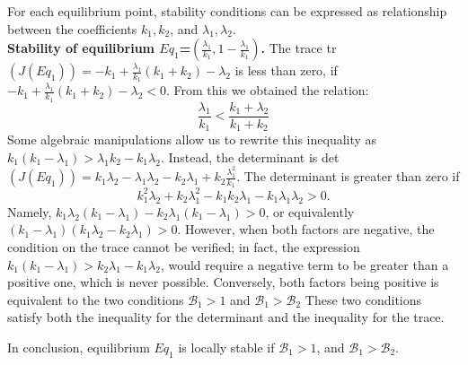 For each equilibrium point, stability conditions can be expressed as relationship between the coefficients $k_1, k_2$, and $\lambda_1, \lambda_2$.\\

\noindent\textbf{Stability of equilibrium $Eq_1$=$(\frac{\lambda_1}{k_1}, 1-\frac{\lambda_1}{k_1})$.} The trace tr$(J(Eq_1)) = - k_1 + \frac{\lambda_1}{k_1}(k_1+k_2) - \lambda_2$ is  less than zero, if $-k_1 + \frac{\lambda_1}{k_1}( k_1 + k_2) - \lambda_2 < 0$. From this we obtained the relation:
\[\frac{\lambda_1}{k_1} < \frac{k_1 + \lambda_2}{k_1 + k_2} \]
Some algebraic manipulations allow us to rewrite this inequality as $k_1 (k_1 - \lambda_1) > \lambda_1 k_2 - k_1 \lambda_2$. Instead, the determinant is det$(J(Eq_1)) = k_1 \lambda_2 - \lambda_1 \lambda_2 -k_2 \lambda_1 + k_2 \frac{\lambda_1^2}{k_1}$. The determinant is greater than zero if
 \[ k_1^2 \lambda_2+ k_2 \lambda_1^2 - k_1 k_2 \lambda_1 -k_1 \lambda_1 \lambda_2 > 0.\]
  Namely, $k_1 \lambda_2(k_1 -\lambda_1) - k_2 \lambda_1 (k_1 - \lambda_1) > 0$, or equivalently $(k_1 - \lambda_1)(k_1 \lambda_2 - k_2 \lambda_1) > 0$. However, when both factors are negative, the condition on the trace cannot be verified; in fact, the expression \( k_1(k_1 - \lambda_1) > k_2 \lambda_1 - k_1 \lambda_2 \), would require a negative term to be greater than a positive one, which is never possible. Conversely, both factors being positive is equivalent to the two conditions $\mathcal{B}_1 > 1$ and $\mathcal{B}_1 > \mathcal{B}_2$ These two conditions satisfy both the inequality for the determinant and the
  inequality for the trace.
  
  
  
In conclusion, equilibrium $Eq_1$ is locally stable if $\mathcal{B}_1 > 1$, and $\mathcal{B}_1 > \mathcal{B}_2$.
\\ 
 
